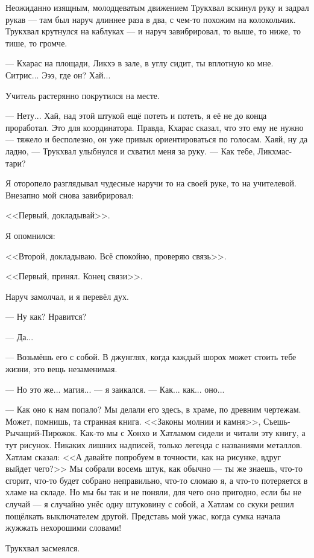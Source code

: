 Неожиданно изящным, молодцеватым движением Трукхвал вскинул руку и задрал рукав --- там был наруч длиннее раза в два, с чем-то похожим на колокольчик.
Трукхвал крутнулся на каблуках --- и наруч завибрировал, то выше, то ниже, то тише, то громче.

--- Кхарас на площади, Ликхэ в зале, в углу сидит, ты вплотную ко мне.
Ситрис...
Эээ, где он?
Хай...

Учитель растерянно покрутился на месте.

--- Нету...
Хай, над этой штукой ещё потеть и потеть, я её не до конца проработал.
Это для координатора.
Правда, Кхарас сказал, что это ему не нужно --- тяжело и бесполезно, он уже привык ориентироваться по голосам.
Хаяй, ну да ладно, --- Трукхвал улыбнулся и схватил меня за руку.
--- Как тебе, Ликхмас-тари?

Я оторопело разглядывал чудесные наручи то на своей руке, то на учителевой.
Внезапно мой снова завибрировал:

<<Первый, докладывай>>.

Я опомнился:

<<Второй, докладываю.
Всё спокойно, проверяю связь>>.

<<Первый, принял.
Конец связи>>.

Наруч замолчал, и я перевёл дух.

--- Ну как?
Нравится?

--- Да...

--- Возьмёшь его с собой.
В джунглях, когда каждый шорох может стоить тебе жизни, это вещь незаменимая.

--- Но это же... магия... --- я заикался.
--- Как... как... оно...

--- Как оно к нам попало?
Мы делали его здесь, в храме, по древним чертежам.
Может, помнишь, та странная книга.
<<Законы молнии и камня>>, Съешь-Рычащий-Пирожок.
Как-то мы с Хонхо и Хатламом сидели и читали эту книгу, а тут рисунок.
Никаких лишних надписей, только легенда с названиями металлов.
Хатлам сказал: <<А давайте попробуем в точности, как на рисунке, вдруг выйдет чего?>>
Мы собрали восемь штук, как обычно --- ты же знаешь, что-то сгорит, что-то будет собрано неправильно, что-то сломаю я, а что-то потеряется в хламе на складе.
Но мы бы так и не поняли, для чего оно пригодно, если бы не случай --- я случайно унёс одну штуковину с собой, а Хатлам со скуки решил пощёлкать выключателем другой.
Представь мой ужас, когда сумка начала жужжать нехорошими словами!

Трукхвал засмеялся.

